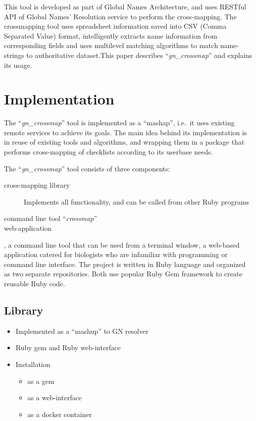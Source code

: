 \documentclass{bmcart}
\begin{document}
  This tool is developed as part of Global Names Architecture, and uses RESTful
  API of Global Names' Resolution service to perform the cross-mapping. The
  crossmapping tool uses spreadsheet information saved into CSV (Comma
  Separated Value) format, intelligently extracts name information from
  corresponding fields and uses multilevel matching algorithms to match
  name-strings to authoritative dataset.This paper describes
  ``\textit{gn\_crossmap}'' and explains its usage.

\section*{Implementation}

The ``\textit{gn\_crossmap}'' tool is implemented as a ``mashap'', i.e.\ it
uses existing remote services to achieve its goals. The main idea behind its
implementation is in reuse of existing tools and algorithms, and wrapping them
in a package that performs cross-mapping of checklists according to its
userbase needs.

The ``\textit{gn\_crossmap}'' tool consists of three components:

\begin{description}
  \item[cross-mapping library] Implements all functionality, and can be called
    from other Ruby programs
  \item[command line tool ``\textit{crossmap}'']
  \item [web-application]
\end{description}

, a
command line tool that can be used from a terminal window, a web-based
application catered for biologists who are infamiliar with programming or
command line interface. The project is written in Ruby language and organized
as two separate repositories. Both use popular Ruby Gem framework to create
reusable Ruby code.

\subsection*{Library}


\begin{itemize}
  \item Implemented as a ``mashup'' to GN resolver
  \item Ruby gem and Ruby web-interface
  \item Installation
    \begin{itemize}
      \item as a gem
      \item as a web-interface
      \item as a docker container
    \end{itemize}
\end{itemize}
\end{document}
